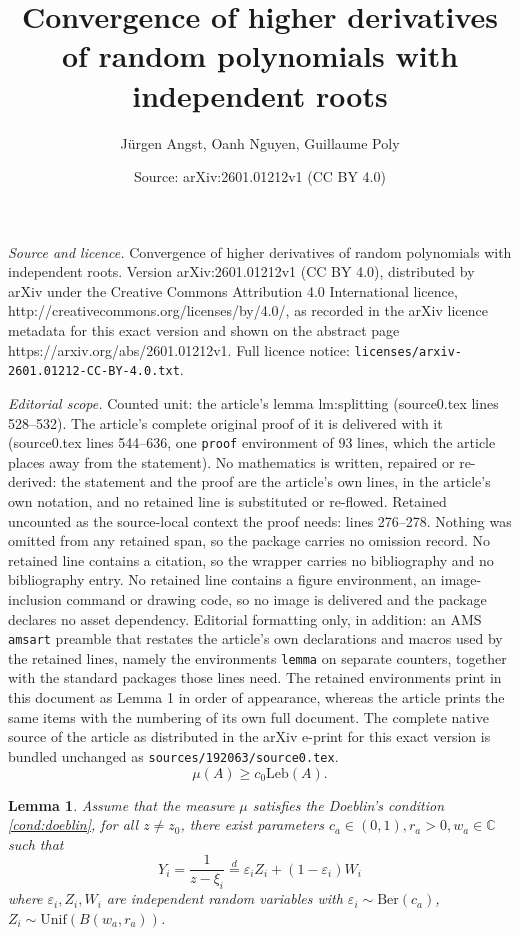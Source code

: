 \documentclass[10pt,a4paper]{amsart}
\title{Convergence of higher derivatives of random polynomials with independent roots}
\author{J\"urgen Angst, Oanh Nguyen, Guillaume Poly}
\date{Source: arXiv:2601.01212v1 (CC BY 4.0)}
\newtheorem{lemma}{Lemma}
\newcommand\C{{\mathbb{C}}}
\newcommand{\ep}{\varepsilon}
\begin{document}
\maketitle

\noindent\emph{Source and licence.} Convergence of higher derivatives of random polynomials with independent roots. Version arXiv:2601.01212v1 (CC BY 4.0), distributed by arXiv under the Creative Commons Attribution 4.0 International licence, http://creativecommons.org/licenses/by/4.0/, as recorded in the arXiv licence metadata for this exact version and shown on the abstract page https://arxiv.org/abs/2601.01212v1. Full licence notice: \texttt{licenses/arxiv-2601.01212-CC-BY-4.0.txt}.\par\smallskip

\noindent\textit{Editorial scope.} Counted unit: the article's lemma lm:splitting (source0.tex lines 528--532). The article's complete original proof of it is delivered with it (source0.tex lines 544--636, one \texttt{proof} environment of 93 lines, which the article places away from the statement). No mathematics is written, repaired or re-derived: the statement and the proof are the article's own lines, in the article's own notation, and no retained line is substituted or re-flowed.  Retained uncounted as the source-local context the proof needs: lines 276--278.  Nothing was omitted from any retained span, so the package carries no omission record.  No retained line contains a citation, so the wrapper carries no bibliography and no bibliography entry.  No retained line contains a figure environment, an image-inclusion command or drawing code, so no image is delivered and the package declares no asset dependency.  Editorial formatting only, in addition: an AMS \texttt{amsart} preamble that restates the article's own declarations and macros used by the retained lines, namely the environments \texttt{lemma} on separate counters, together with the standard packages those lines need.  The retained environments print in this document as Lemma 1 in order of appearance, whereas the article prints the same items with the numbering of its own full document.  The complete native source of the article as distributed in the arXiv e-print for this exact version is bundled unchanged as \texttt{sources/192063/source0.tex}.
 \begin{equation}
 	\mu(A)\ge c_0 \text{Leb}(A).\label{cond:doeblin}
 \end{equation}

 \begin{lemma}\label{lm:splitting}
 	Assume that the measure $\mu$ satisfies the Doeblin's condition \ref{cond:doeblin}, for all $z\neq z_0$, there exist parameters $c_a\in (0, 1), r_a>0, w_a\in \C$ such that  
 	$$Y_i = \frac{1}{z-\xi_i} \overset{d}{=} \ep_i Z_i + (1-\ep_i)W_i$$
 	where $\ep_i, Z_i, W_i$ are independent random variables with $\ep_i\sim \text{Ber}(c_a)$, $Z_i\sim \text{Unif}(B(w_a, r_a))$.
 \end{lemma}
\end{document}
